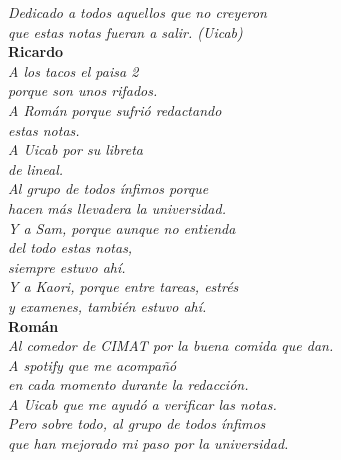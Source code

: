 \documentclass[12pt,a4paper]{book}
\begin{document}
    
    
    \thispagestyle{empty}
    

    \begin{flushright}
      \thispagestyle{empty}

        \textit{Dedicado a todos aquellos que no creyeron\\
        que estas notas fueran a salir. (Uicab)}\\[1cm]

        \textbf{Ricardo}\\[0.3cm]
        \textit{A los tacos el paisa 2\\
        porque son unos rifados.\\
        A Román porque sufrió redactando\\
        estas notas.\\
        A Uicab por su libreta\\
        de lineal.\\
        Al grupo de todos ínfimos porque\\
        hacen más llevadera la universidad.\\
        Y a Sam, porque aunque no entienda\\
        del todo estas notas,\\
        siempre estuvo ahí.\\
        Y a Kaori, porque entre tareas, estrés\\
        y examenes, también estuvo ahí.}\\[1.2cm]


        \textbf{Román}\\[0.3cm]

        \textit{Al comedor de CIMAT por la buena comida que dan.\\
        A spotify que me acompañó\\
        en cada momento durante la redacción.\\
        A Uicab que me ayudó a verificar las notas.\\
        Pero sobre todo, al grupo de todos ínfimos \\
        que han mejorado mi paso por la universidad.}

    \end{flushright}


    \cleardoublepage
    \thispagestyle{empty}
\end{document}

